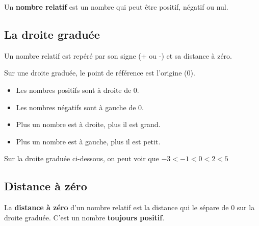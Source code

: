 \begin{definitionbox}
Un \textbf{nombre relatif} est un nombre qui peut être positif, négatif ou nul.
\end{definitionbox}

\subsection{La droite graduée}

Un nombre relatif est repéré par son signe (+ ou -) et sa distance à zéro.

Sur une droite graduée, le point de référence est l'origine (0).

\begin{proprietebox}
\begin{itemize}[label = \textbullet]
\item Les nombres positifs sont à droite de 0.
\item Les nombres négatifs sont à gauche de 0.
\item Plus un nombre est à droite, plus il est grand.
\item Plus un nombre est à gauche, plus il est petit.
\end{itemize}
\end{proprietebox}

\begin{examplebox}
Sur la droite graduée ci-dessous, on peut voir que $-3 < -1 < 0 < 2 < 5$

\begin{center}
\end{center}
\end{examplebox}

\subsection{Distance à zéro}

\begin{definitionbox}
La \textbf{distance à zéro} d'un nombre relatif est la distance qui le sépare de 0 sur la droite graduée. C'est un nombre \textbf{toujours positif}.
\end{definitionbox}

